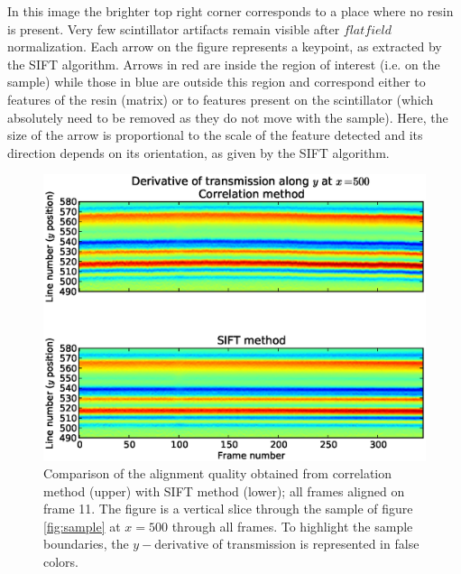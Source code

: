 \documentclass[preprint]{iucr}
\begin{document}
In this image the brighter top right corner corresponds to a place where no
resin is present. Very few scintillator artifacts remain visible after $flat
field$ normalization.
Each arrow on the figure represents a keypoint, as extracted by the SIFT
algorithm. Arrows in red are inside the region of interest (i.e. on the sample)
while those in blue are outside this region and
correspond either to features of the resin (matrix) or to features present on
the scintillator (which absolutely need to be removed as they do not move
with the sample).
Here, the size of the arrow is proportional to the scale of the feature
detected and its direction depends on its orientation, as given by the SIFT algorithm.

\begin{figure}
\label{fig:alignment}
\begin{center}
\includegraphics[width=15cm]{alignment_h.eps}
\caption{Comparison of the alignment quality obtained from correlation method
(upper) with SIFT method (lower); all frames aligned on
frame 11. The figure is a vertical slice through the sample of figure
\ref{fig:sample} at $x=500$ through all frames. To highlight the sample
boundaries, the $y-$derivative of transmission is represented in false colors.}
\end{center}
\end{figure}
\end{document}
